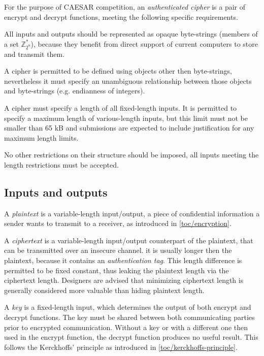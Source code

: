 For the purpose of CAESAR competition, an \textit{authenticated cipher} is a pair of encrypt and decrypt functions, meeting the following specific requirements.

All inputs and outputs should be represented as opaque byte-strings (members of a set $\mathbb{Z}_{2^8}^*$), because they benefit from direct support of current computers to store and transmit them.

A cipher is permitted to be defined using objects other then byte-strings, nevertheless it must specify an unambiguous relationship between those objects and byte-strings (e.g. endianness of integers).

A cipher must specify a length of all fixed-length inputs. It is permitted to specify a maximum length of various-length inputs, but this limit must not be smaller than 65 kB and submissions are expected to include justification for any maximum length limits.

No other restrictions on their structure should be imposed, all inputs meeting the length restrictions must be accepted.

\subsection{Inputs and outputs}



A \textit{plaintext} is a variable-length input/output, a piece of confidential information a sender wants to transmit to a receiver, as introduced in \autoref{toc/encryption}.

A \textit{ciphertext} is a variable-length input/output counterpart of the plaintext, that can be transmitted over an insecure channel. it is usually longer then the plaintext, because it contains an \textit{authentication tag}. This length difference is permitted to be fixed constant, thus leaking the plaintext length via the ciphertext length. Designers are advised that minimizing ciphertext length is generally considered more valuable than hiding plaintext length.

A \textit{key} is a fixed-length input, which determines the output of both encrypt and decrypt functions. The key must be shared between both communicating parties prior to encrypted communication. Without a key or with a different one then used in the encrypt function, the decrypt function produces no useful result. This follows the Kerckhoffs' principle as introduced in \autoref{toc/kerckhoffs-principle}.

